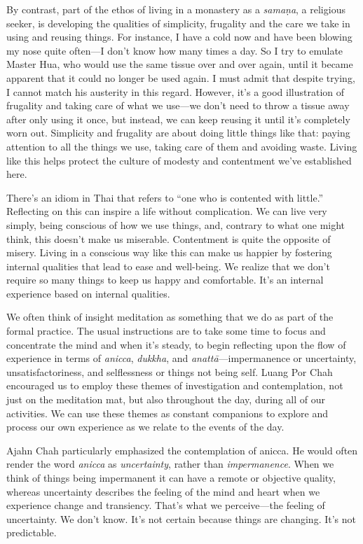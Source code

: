 By contrast, part of the ethos of living in a monastery as a 
\emph{samaṇa}, a religious seeker, is developing the qualities of 
simplicity, frugality and the care we take in using and reusing things. 
For instance, I have a cold now and have been blowing my nose quite 
often---I don't know how many times a day. So I try to emulate Master 
Hua, who would use the same tissue over and over again, until it became 
apparent that it could no longer be used again. I must admit that 
despite trying, I cannot match his austerity in this regard. However, 
it's a good illustration of frugality and taking care of what we 
use---we don't need to throw a tissue away after only using it once, 
but instead, we can keep reusing it until it's completely worn out. 
Simplicity and frugality are about doing little things like that: 
paying attention to all the things we use, taking care of them and 
avoiding waste. Living like this helps protect the culture of modesty 
and contentment we've established here.

There's an idiom in Thai that refers to ``one who is contented with 
little.'' Reflecting on this can inspire a life without complication. 
We can live very simply, being conscious of how we use things, and, 
contrary to what one might think, this doesn't make us miserable. 
Contentment is quite the opposite of misery. Living in a conscious way 
like this can make us happier by fostering internal qualities that lead 
to ease and well-being. We realize that we don't require so many things 
to keep us happy and comfortable. It's an internal experience based on 
internal qualities.


We often think of insight meditation as something that we do as part of 
the formal practice. The usual instructions are to take some time to 
focus and concentrate the mind and when it's steady, to begin 
reflecting upon the flow of experience in terms of \emph{anicca}, 
\emph{dukkha}, and \emph{anattā}---impermanence or uncertainty, 
unsatisfactoriness, and selflessness or things not being self. Luang 
Por Chah encouraged us to employ these themes of investigation and 
contemplation, not just on the meditation mat, but also throughout the 
day, during all of our activities. We can use these themes as constant 
companions to explore and process our own experience as we relate to 
the events of the day.

Ajahn Chah particularly emphasized the contemplation of anicca. He 
would often render the word \emph{anicca} as \emph{uncertainty}, rather 
than \emph{impermanence}. When we think of things being impermanent it 
can have a remote or objective quality, whereas uncertainty describes 
the feeling of the mind and heart when we experience change and 
transiency. That's what we perceive---the feeling of uncertainty. We 
don't know. It's not certain because things are changing. It's not 
predictable.

